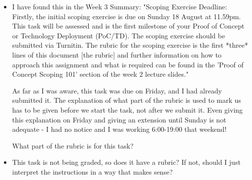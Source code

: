 \documentclass[12pt]{article}
\begin{document}
\begin{itemize}
    \item I have found this in the Week 3 Summary: "Scoping Exercise Deadline: Firstly, the initial scoping exercise is due on Sunday 18 August at 11.59pm. This task will be assessed and is the first milestone of your Proof of Concept or Technology Deployment (PoC/TD). The scoping exercise should be submitted via Turnitin. The rubric for the scoping exercise is the first *three* lines of this document [the rubric] and further information on how to approach this assignment and what is required can be found in the 'Proof of Concept Scoping 101' section of the week 2 lecture slides."
    
    As far as I was aware, this task was due on Friday, and I had already submitted it. The explanation of what part of the rubric is used to mark us has to be given before we start the task, not after we submit it. Even giving this explanation on Friday and giving an extension until Sunday is not adequate - I had no notice and I was working 6:00-19:00 that weekend!
    
    What part of the rubric is for this task?
    
    \item This task is not being graded, so does it have a rubric? If not, should I just interpret the instructions in a way that makes sense?
    

\end{itemize}
\end{document}
